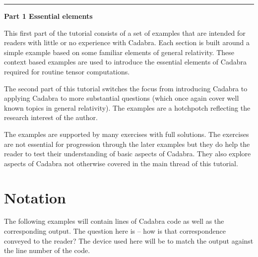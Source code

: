 \documentclass[a4paper,12pt]{article}
\numberwithin{equation}{section}%
\begin{document}
\clearpage

\hrule height 0pt
\vskip 4cm
{\Huge\bf Part 1 Essential elements}
\vskip 2cm

This first part of the tutorial consists of a set of examples that are intended for readers
with little or no experience with Cadabra. Each section is built around a simple example
based on some familiar elements of general relativity. These context based examples are used
to introduce the essential elements of Cadabra required for routine tensor computations.

The second part of this tutorial switches the focus from introducing Cadabra to applying
Cadabra to more substantial questions (which once again cover well known topics in general
relativity). The examples are a hotchpotch reflecting the research interest of the author.

The examples are supported by many exercises with full solutions. The exercises are not
essential for progression through the later examples but they do help the reader to test
their understanding of basic aspects of Cadabra. They also explore aspects of Cadabra not
otherwise covered in the main thread of this tutorial.

\clearpage

\section*{Notation}



The following examples will contain lines of Cadabra code as well as the
corresponding output. The question here is -- how is that correspondence conveyed to the
reader? The device used here will be to match the output against the line number of the code.
\end{document}
